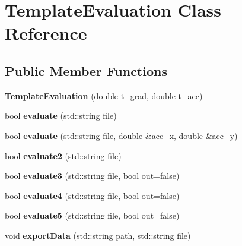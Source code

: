 \hypertarget{classTemplateEvaluation}{}\section{Template\+Evaluation Class Reference}
\label{classTemplateEvaluation}
\subsection*{Public Member Functions}
\begin{DoxyCompactItemize}
\item 
{\bfseries Template\+Evaluation} (double t\+\_\+grad, double t\+\_\+acc)\hypertarget{classTemplateEvaluation_aae06cd355b4c4a03221527612ef85c1f}{}\label{classTemplateEvaluation_aae06cd355b4c4a03221527612ef85c1f}

\item 
bool {\bfseries evaluate} (std\+::string file)\hypertarget{classTemplateEvaluation_a95f928c675000aee3dbf079b7853eb7a}{}\label{classTemplateEvaluation_a95f928c675000aee3dbf079b7853eb7a}

\item 
bool {\bfseries evaluate} (std\+::string file, double \&acc\+\_\+x, double \&acc\+\_\+y)\hypertarget{classTemplateEvaluation_a3b086c476e5c526cfd171cc3b6d476d3}{}\label{classTemplateEvaluation_a3b086c476e5c526cfd171cc3b6d476d3}

\item 
bool {\bfseries evaluate2} (std\+::string file)\hypertarget{classTemplateEvaluation_a55fc26b317e77696133370fc12088be4}{}\label{classTemplateEvaluation_a55fc26b317e77696133370fc12088be4}

\item 
bool {\bfseries evaluate3} (std\+::string file, bool out=false)\hypertarget{classTemplateEvaluation_a0d195cb1639286f3b0c380af1b1e3da4}{}\label{classTemplateEvaluation_a0d195cb1639286f3b0c380af1b1e3da4}

\item 
bool {\bfseries evaluate4} (std\+::string file, bool out=false)\hypertarget{classTemplateEvaluation_a24e7297912bb5ee73b808e39227409b0}{}\label{classTemplateEvaluation_a24e7297912bb5ee73b808e39227409b0}

\item 
bool {\bfseries evaluate5} (std\+::string file, bool out=false)\hypertarget{classTemplateEvaluation_af23cc659648615f75baefc996b7e13d0}{}\label{classTemplateEvaluation_af23cc659648615f75baefc996b7e13d0}

\item 
void {\bfseries export\+Data} (std\+::string path, std\+::string file)\hypertarget{classTemplateEvaluation_ad7ac1c323d282e27103a00c25ac8dd85}{}\label{classTemplateEvaluation_ad7ac1c323d282e27103a00c25ac8dd85}

\end{DoxyCompactItemize}
